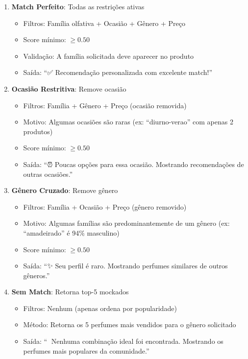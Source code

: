 \documentclass[12pt,a4paper]{article}
\begin{document}
\begin{enumerate}
    \item[\textbf{Nível 0}] \textbf{Match Perfeito}: Todas as restrições ativas
    \begin{itemize}
        \item Filtros: Família olfativa + Ocasião + Gênero + Preço
        \item Score mínimo: $\geq 0.50$
        \item Validação: A família solicitada deve aparecer no produto
        \item Saída: ``✅ Recomendação personalizada com excelente match!''
    \end{itemize}
    
    \item[\textbf{Nível 1}] \textbf{Ocasião Restritiva}: Remove ocasião
    \begin{itemize}
        \item Filtros: Família + Gênero + Preço (ocasião removida)
        \item Motivo: Algumas ocasiões são raras (ex: ``diurno-verao'' com apenas 2 produtos)
        \item Score mínimo: $\geq 0.50$
        \item Saída: ``⏰ Poucas opções para essa ocasião. Mostrando recomendações de outras ocasiões.''
    \end{itemize}
    
    \item[\textbf{Nível 2}] \textbf{Gênero Cruzado}: Remove gênero
    \begin{itemize}
        \item Filtros: Família + Ocasião + Preço (gênero removido)
        \item Motivo: Algumas famílias são predominantemente de um gênero (ex: ``amadeirado'' é 94\% masculino)
        \item Score mínimo: $\geq 0.50$
        \item Saída: ``✨ Seu perfil é raro. Mostrando perfumes similares de outros gêneros.''
    \end{itemize}
    
    \item[\textbf{Nível 3}] \textbf{Sem Match}: Retorna top-5 mockados
    \begin{itemize}
        \item Filtros: Nenhum (apenas ordena por popularidade)
        \item Método: Retorna os 5 perfumes mais vendidos para o gênero solicitado
        \item Saída: ``📌 Nenhuma combinação ideal foi encontrada. Mostrando os perfumes mais populares da comunidade.''
    \end{itemize}
\end{enumerate}
\end{document}

